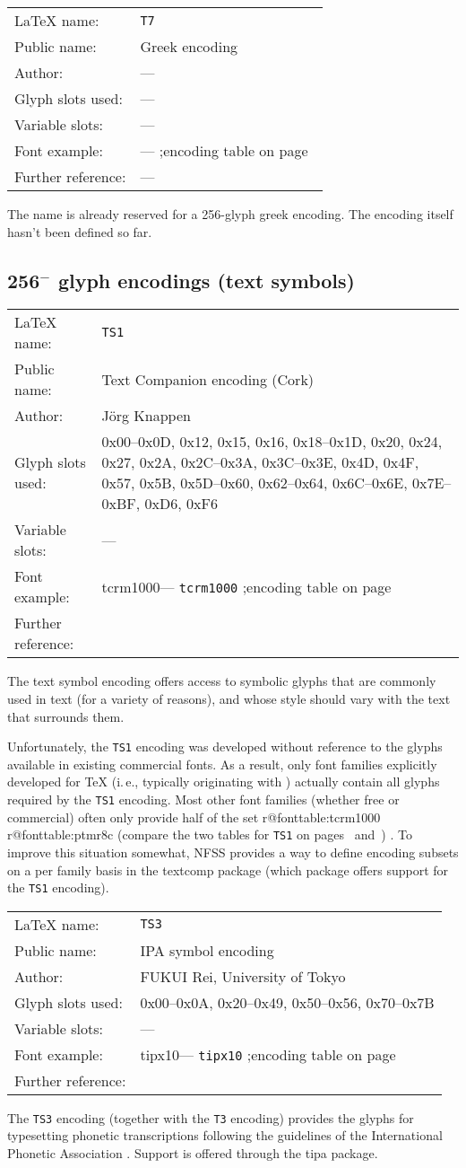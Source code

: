 \documentclass{ltxguide}[1994/11/20]
\makeatletter
\providecommand{\Enc}[1]{\texttt{#1}}
\providecommand{\Pkg}[1]{%
  \textsf{#1}}
\newenvironment{encodinginfo}[7]%
  {\noindent
   \begin{tabularx}{\linewidth}{@{}l>{\raggedright\let\\\tabularnewline}X}%
     \LaTeX{} name:          & \texttt{#1}\\%
     Public name:          & #2\\%
     Author:                   & #3\\%
     Glyph slots used: & #4\\%
     Variable slots:     & #5\\%
     Font example:     & \def\@tempa{#6}\ifx\@tempa\@empty---%
                            \else\texttt{#6}\referenceftable{#6}\fi\\%
     Further reference:                & #7%
   \end{tabularx}%
   \par\nobreak
   \vspace*{3pt}%
   \quote
  }%
  {\endquote
   \vspace{6pt}}
\def\referenceftable#1{
  \@ifundefined{r@fonttable:#1}%
  \relax
  {;\space encoding table on page~\pageref{fonttable:#1}}%
}
\makeatother
\begin{document}
\begin{encodinginfo}{T7}
        {Greek encoding}
   {---}
   {---}
   {---}
   {}
   {---}

The name is already reserved for a 256-glyph greek encoding. The encoding
itself hasn't been defined so far.

\end{encodinginfo}



\subsection{256$^-$ glyph encodings (text symbols)}

\begin{encodinginfo}{TS1}
        {Text Companion encoding (Cork)}
        {J\"org Knappen}
  {0x00--0x0D, 0x12, 0x15, 0x16, 0x18--0x1D, 0x20, 0x24, 0x27, 0x2A,
   0x2C--0x3A, 0x3C--0x3E, 0x4D, 0x4F, 0x57, 0x5B, 0x5D--0x60,
   0x62--0x64, 0x6C--0x6E, 0x7E--0xBF, 0xD6, 0xF6}
  {---}
        {tcrm1000}
        {\cite{Knappen:TB17-2-96}}

   The text symbol encoding offers access to symbolic glyphs that are
  commonly used in text (for a variety of reasons), and whose style
  should vary with the text that surrounds them.

  Unfortunately, the \Enc{TS1} encoding was developed without
  reference to the glyphs available in existing commercial fonts.
  As a result, only font families
  explicitly developed for \TeX{} (i.\,e., typically originating with
  \MF{}) actually contain all glyphs required by the \Enc{TS1}
  encoding.  Most other font families (whether free or commercial)
  often only provide half of the set%
\expandafter\ifx\csname r@fonttable:tcrm1000\endcsname\relax
\else
  \expandafter\ifx\csname r@fonttable:ptmr8c\endcsname\relax
  \else
    \space (compare the two tables for \Enc{TS1} on
     pages~\pageref{fonttable:tcrm1000}
     and~\pageref{fonttable:ptmr8c})%
  \fi
\fi.
  To improve this situation somewhat, NFSS provides a way to define encoding
  subsets on a per family basis in the \Pkg{textcomp} package (which
  package offers support for the \Enc{TS1} encoding).
\end{encodinginfo}


\begin{encodinginfo}{TS3}
        {IPA symbol encoding}
        {FUKUI Rei, University of Tokyo}
        {0x00--0x0A, 0x20--0x49, 0x50--0x56, 0x70--0x7B}
        {---}
        {tipx10}
        {\cite{Rei:TB17-2-102}}

  The \Enc{TS3} encoding (together with the \Enc{T3} encoding) provides the
  glyphs for typesetting phonetic transcriptions following the
  guidelines of the International Phonetic Association \cite{ipa}.  Support
  is offered through the \Pkg{tipa} package.
\end{encodinginfo}
\end{document}
